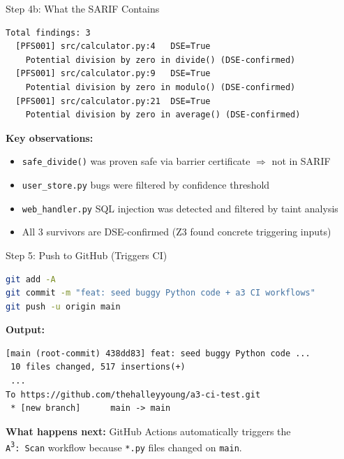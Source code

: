 \documentclass[aspectratio=169]{beamer}
\begin{document}
\begin{frame}[fragile]{Step 4b: What the SARIF Contains}
\begin{lstlisting}
Total findings: 3
  [PFS001] src/calculator.py:4   DSE=True
    Potential division by zero in divide() (DSE-confirmed)
  [PFS001] src/calculator.py:9   DSE=True
    Potential division by zero in modulo() (DSE-confirmed)
  [PFS001] src/calculator.py:21  DSE=True
    Potential division by zero in average() (DSE-confirmed)
\end{lstlisting}

\medskip

\textbf{Key observations:}
\begin{itemize}
  \item \texttt{safe\_divide()} was proven safe via barrier certificate $\Rightarrow$ not in SARIF
  \item \texttt{user\_store.py} bugs were filtered by confidence threshold
  \item \texttt{web\_handler.py} SQL injection was detected and filtered by taint analysis
  \item All 3 survivors are DSE-confirmed (Z3 found concrete triggering inputs)
\end{itemize}
\end{frame}

\begin{frame}[fragile]{Step 5: Push to GitHub (Triggers CI)}
\begin{lstlisting}[language=bash]
git add -A
git commit -m "feat: seed buggy Python code + a3 CI workflows"
git push -u origin main
\end{lstlisting}

\textbf{Output:}
\begin{lstlisting}
[main (root-commit) 438dd83] feat: seed buggy Python code ...
 10 files changed, 517 insertions(+)
 ...
To https://github.com/thehalleyyoung/a3-ci-test.git
 * [new branch]      main -> main
\end{lstlisting}

\textbf{What happens next:} GitHub Actions automatically triggers the\\
\texttt{A\textsuperscript{3}: Scan} workflow because \texttt{*.py} files changed on \texttt{main}.
\end{frame}
\end{document}
